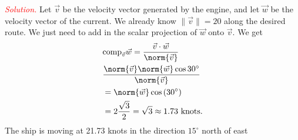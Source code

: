 \documentclass{report}
\begin{document}
    \bigbreak \noindent 
    \textcolor{red}{\textit{Solution.}}
    Let $\vec{v}$ be the velocity vector generated by the engine, and let $\vec{w}$ be the velocity vector of the current. We already know $\|\vec{v}\| = 20$ along the desired route. We just need to add in the scalar projection of $\vec{w}$ onto $\vec{v}$. We get
    \begin{align*}
        &\text{comp}_{\vec{v}}\vec{w} = \frac{\vec{v} \cdot \vec{w}}{\norm{\vec{v}}} \\
        &\frac{\norm{\vec{v}}\norm{\vec{w}}\cos{30^{\circ}}}{\norm{\vec{v}}} \\
        &=\norm{\vec{w}}\cos{(30^{\circ})} \\
        &=2 \frac{\sqrt{3}}{2} = \sqrt{3} \approx  1.73\ \text{knots}
    .\end{align*}
    \bigbreak \noindent 
    The ship is moving at 21.73 knots in the direction $15^{\circ}$ north of east

    \bigbreak \noindent 
\end{document}
